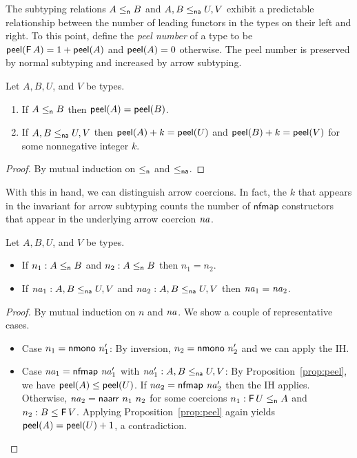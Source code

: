 \documentclass[acmsmall,screen]{acmart}
\begin{document}
The subtyping relations \(A \leq_{\mathsf{n}} B\) and \(A, B \leq_{\mathsf{na}} U, V\) exhibit
a predictable relationship between the number of leading functors in
the types on their left and right. To this point, define the \emph{peel number} of a
type to be  \(\mathsf{peel}(\mathsf{F}\, A) = 1 + \mathsf{peel}(A)\) and \(\mathsf{peel}(A) = 0\) otherwise.  The
peel number is preserved by normal subtyping and increased by arrow subtyping.
\begin{proposition}\label{prop:peel}
  Let \(A, B, U\), and \(V\) be types.
  \begin{enumerate}
    \item If \(A \leq_{\mathsf{n}} B\) then \(\mathsf{peel}(A) = \mathsf{peel}(B)\).
    \item If \(A, B \leq_{\mathsf{na}} U, V\) then \(\mathsf{peel}(A) + k = \mathsf{peel}(U)\) and \(\mathsf{peel}(B) + k = \mathsf{peel}(V)\) for some nonnegative integer \(k\).
  \end{enumerate}
\end{proposition}
\begin{proof}
  By mutual induction on \(\leq_{\mathsf{n}}\) and \(\leq_{\mathsf{na}}\).
\end{proof}
With this in hand, we can distinguish arrow coercions. In fact, the \(k\) that
appears in the invariant for arrow subtyping counts the number of
\(\mathsf{nfmap}\) constructors that appear in the underlying arrow coercion
\(\mathit{na}\).

\begin{proposition}\label{thm:uniqueness}
  Let \(A, B, U\), and \(V\) be types.
  \begin{itemize}
    \item If \(n_1 : A \leq_{\mathsf{n}} B\) and \(n_2 : A \leq_{\mathsf{n}} B\) then \(n_1 = n_2\).
    \item If 
      \(\mathit{na}_1 : A, B \leq_{\mathsf{na}} U, V\)
      and
      \(\mathit{na}_2 : A, B \leq_{\mathsf{na}} U, V\)
      then 
      \(\mathit{na}_1 = \mathit{na}_2\).
  \end{itemize}
\end{proposition}
\begin{proof}
  By mutual induction on \(n\) and \(\mathit{na}\). We show a couple of representative cases.
\begin{itemize}
  \item Case \(n_1 = \mathsf{nmono}\ n_1'\): By inversion, \(n_2 = \mathsf{nmono}\ n_2'\) and we can apply the IH.
  \item Case \(\mathit{na}_1 = \mathsf{nfmap}\ \mathit{na}_1'\) with \(\mathit{na}_1' : A, B \leq_{\mathsf{na}} U, V\):
        By Proposition~\ref{prop:peel}, we have \(\mathsf{peel}(A) \leq \mathsf{peel}(U)\).
        If \(\mathit{na}_2 = \mathsf{nfmap}\ \mathit{na}_2'\) then the IH applies. Otherwise,
        \(\mathit{na}_2 = \mathsf{naarr}\ n_1\ n_2\) for some coercions \(n_1 : \mathsf{F}\, U \leq_{\mathsf{n}} A\)
        and \(n_2 : B \leq \mathsf{F}\, V\). Applying Proposition~\ref{prop:peel} again yields
        \(\mathsf{peel}(A) = \mathsf{peel}(U) + 1\), a contradiction.\qedhere
\end{itemize}
\end{proof}
\end{document}

